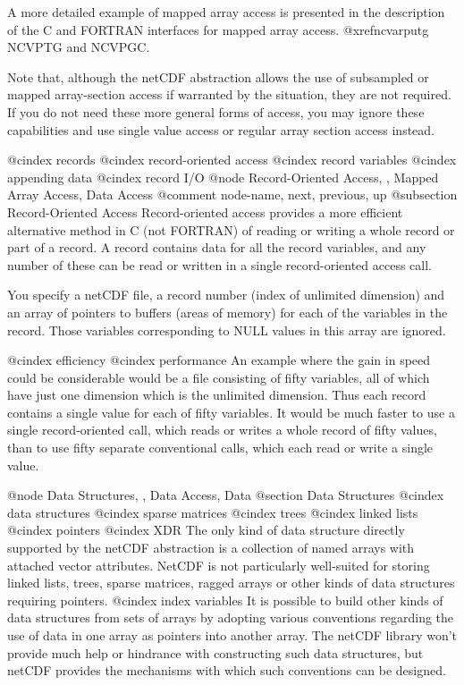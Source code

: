 A more detailed example of mapped array access is presented in the
description of the C and FORTRAN interfaces for mapped array access.
@xref{ncvarputg NCVPTG and NCVPGC}.

Note that, although the netCDF abstraction allows the use of subsampled
or mapped array-section access if warranted by the situation, they are
not required.  If you do not need these more general forms of access,
you may ignore these capabilities and use single value access or regular
array section access instead.

@cindex records
@cindex record-oriented access
@cindex record variables
@cindex appending data
@cindex record I/O
@node Record-Oriented Access,  , Mapped Array Access, Data Access
@comment  node-name,  next,  previous,  up
@subsection Record-Oriented Access
Record-oriented access provides a more efficient alternative
method in C (not FORTRAN)
of reading or writing a whole record or part of a record.
A record contains data for all the record variables, and any number of these
can be read or written in a single record-oriented access call.

You specify a netCDF file,
a record number (index of unlimited dimension) and an array of pointers
to buffers (areas of memory) for each of the variables in the record.
Those variables corresponding to NULL values in this array are ignored.

@cindex efficiency
@cindex performance
An example where the gain in speed could be considerable would be
a file consisting of
fifty variables, all of which have just one dimension which
is the unlimited dimension.
Thus each record contains a single value for each of fifty variables.
It would be much faster to use a single record-oriented call, which
reads or writes a whole record of fifty values,
than to use fifty separate conventional calls, which each read or write a
single value.

@node Data Structures,  , Data Access, Data
@section Data Structures
@cindex data structures
@cindex sparse matrices
@cindex trees
@cindex linked lists
@cindex pointers
@cindex XDR
The only kind of data structure directly supported by the netCDF
abstraction is a collection of named
arrays with attached vector attributes.  NetCDF is not particularly
well-suited for storing linked lists, trees, sparse matrices, ragged arrays
or other
kinds of data structures requiring pointers.
@cindex index variables
It is possible to build other kinds of data structures from sets of
arrays by adopting various conventions regarding the
use of data in one array as pointers into another array.  The netCDF
library won't provide much help or hindrance with constructing such data
structures, but netCDF provides the mechanisms with which such
conventions can be designed.

